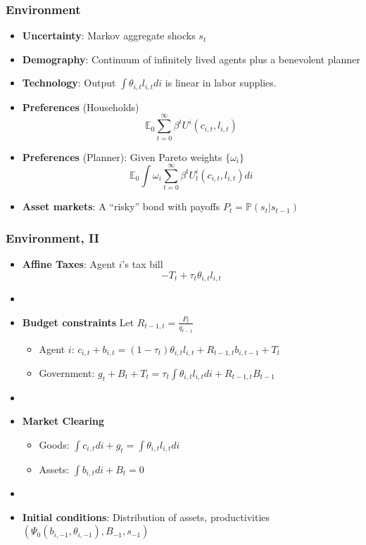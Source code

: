 \documentclass{beamer}
\begin{document}
\begin{frame}
 \frametitle{Environment}
 \begin{itemize}
 \item \textbf{Uncertainty}: Markov aggregate shocks $s_t$
  \item \textbf{Demography}: Continuum of infinitely lived agents plus a benevolent planner
  \item \textbf{Technology}: Output $\int \theta_{i,t} l_{i,t}di$ is linear in labor supplies.
  \item \textbf{Preferences }(Households)
  \begin{equation*}
\mathbb{E}_{0}\sum_{t=0}^{\infty } \beta^t U^{i}\left(
c_{i,t},l_{i,t}\right)  \label{utility lifetime}
\end{equation*}%
\item \textbf{Preferences} (Planner): Given Pareto weights $\{\omega_i\}$
\begin{equation*}
\mathbb{E}_{0}\int \omega_i\sum_{t=0}^{\infty }\beta^t U_{t}^{i}\left( c_{i,t},l_{i,t}\right)di  \label{govmt objective}
\end{equation*}
  \item \textbf{Asset markets}: A ``risky'' bond with payoffs $P_t=\mathbb{P}(s_t|s_{t-1})$
  \end{itemize}

\end{frame}



\begin{frame}
 \frametitle{Environment, II}
 \begin{itemize}
  \item \textbf{Affine Taxes}: Agent $i$'s tax bill
\[- T_t + \tau_t \theta_{i,t}l_{i,t}\]

\item[]
  \item \textbf{Budget constraints} Let $R_{t-1,t}=\frac{P_t}{q_{t-1}}$
  \begin{itemize}
   \item Agent $i$: $ c_{i,t}+b_{i,t}=\left( 1-\tau _{t}\right) \theta _{i,t}l_{i,t}+R_{t-1,t}b_{i,t-1}+T_{t}$
\item Government: $g_{t}+B_{t}+T_t=\tau _{t}\int \theta_{i,t}l_{i,t}di+R_{t-1,t}B_{t-1}$
  \end{itemize}

\item[]
  \item \textbf{Market Clearing}
  \begin{itemize}
   \item Goods: $\int c_{i,t}di+g_t =\int \theta _{i,t} l_{i,t}di$

   \item Assets: $\int b_{i,t}di +B_{t}=0$

  \end{itemize}
  \item[]

\item \textbf{Initial conditions}: Distribution of assets, productivities  $(\Psi_0(b_{i,-1}, \theta_{i,-1
}),B_{-1},s_{-1})$
\end{itemize}
\end{frame}
\end{document}
